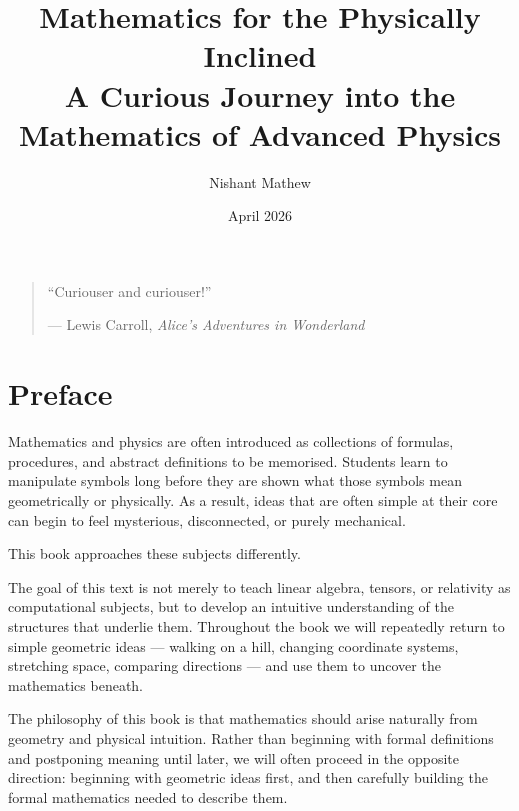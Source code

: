 \documentclass[11pt,openany]{book}
\title{\Huge Mathematics for the Physically Inclined\\[0.5em]
\Large A Curious Journey into the Mathematics of Advanced Physics}
\author{Nishant Mathew}
\date{April 2026}
\theoremstyle{definition}
\begin{document}
\frontmatter

\maketitle


\vspace*{0.3\textheight}

\begin{quote}
\centering
``Curiouser and curiouser!''

\medskip

--- Lewis Carroll, \textit{Alice's Adventures in Wonderland}
\end{quote}

\vspace{1cm}





\chapter*{Preface}

Mathematics and physics are often introduced as collections of formulas, procedures, 
and abstract definitions to be memorised. Students learn to manipulate symbols long 
before they are shown what those symbols mean geometrically or physically. As a result, 
ideas that are often simple at their core can begin to feel mysterious, disconnected, 
or purely mechanical.

\medskip

This book approaches these subjects differently.


\medskip

The goal of this text is not merely to teach linear algebra, tensors, or relativity as 
computational subjects, but to develop an intuitive understanding of the structures that 
underlie them. Throughout the book we will repeatedly return to simple geometric ideas 
--- walking on a hill, changing coordinate systems, stretching space, comparing directions 
--- and use them to uncover the mathematics beneath.

\medskip

The philosophy of this book is that mathematics should arise naturally from geometry and 
physical intuition. Rather than beginning with formal definitions and postponing meaning 
until later, we will often proceed in the opposite direction: beginning with geometric 
ideas first, and then carefully building the formal mathematics needed to describe them.
\end{document}

